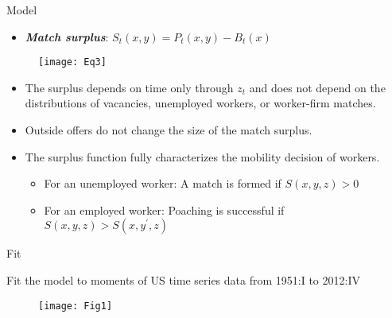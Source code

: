 \documentclass[10pt]{beamer}
\begin{document}
\begin{frame}{Model}

\begin{itemize}
\item \textbf{\textit{Match surplus}}: $S_t(x, y) = P_t(x, y) - B_t(x)$
\end{itemize}

\begin{figure}
    \texttt{[image: Eq3]}
  \end{figure}

\begin{itemize}
\item The surplus depends on time only through $z_t$ and does not depend on the distributions of vacancies, unemployed workers, or worker-firm matches. 
\item Outside offers do not change the size of the match surplus. 
\item The surplus function fully characterizes the mobility decision of workers.
	
	\begin{itemize}
	\item For an unemployed worker: A match is formed if $S(x, y, z) > 0$
	\item For an employed worker: Poaching is successful if $S(x, y, z) > S(x, y^\prime, z)$ 
	\end{itemize}

\end{itemize}

\end{frame}






\begin{frame}{Fit}

\begin{itemize}
{\small \item Fit the model to moments of US time series data from 1951:I to 2012:IV}

\end{itemize}

\begin{figure}
    \texttt{[image: Fig1]}
  \end{figure}
  
\end{frame}
\end{document}
